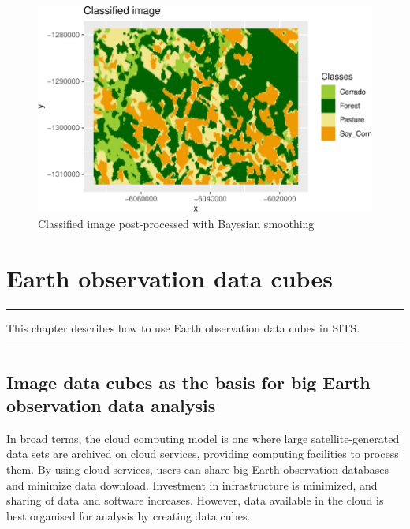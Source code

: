 \documentclass[a4paper,]{tufte-book}
\begin{document}
\begin{figure}

{\centering \includegraphics[width=0.9\linewidth,height=0.9\textheight]{sitsbook_files/figure-latex/unnamed-chunk-15-1} 

}

\caption[Classified image post-processed with Bayesian smoothing]{Classified image post-processed with Bayesian smoothing}\label{fig:unnamed-chunk-15}
\end{figure}

\hypertarget{earth-observation-data-cubes}{%
\chapter{Earth observation data cubes}\label{earth-observation-data-cubes}}

\begin{center}\rule{0.5\linewidth}{0.5pt}\end{center}

This chapter describes how to use Earth observation data cubes in SITS.

\begin{center}\rule{0.5\linewidth}{0.5pt}\end{center}

\hypertarget{image-data-cubes-as-the-basis-for-big-earth-observation-data-analysis}{%
\section{Image data cubes as the basis for big Earth observation data analysis}\label{image-data-cubes-as-the-basis-for-big-earth-observation-data-analysis}}

In broad terms, the cloud computing model is one where large satellite-generated data sets are archived on cloud services, providing computing facilities to process them. By using cloud services, users can share big Earth observation databases and minimize data download. Investment in infrastructure is minimized, and sharing of data and software increases. However, data available in the cloud is best organised for analysis by creating data cubes.
\end{document}
